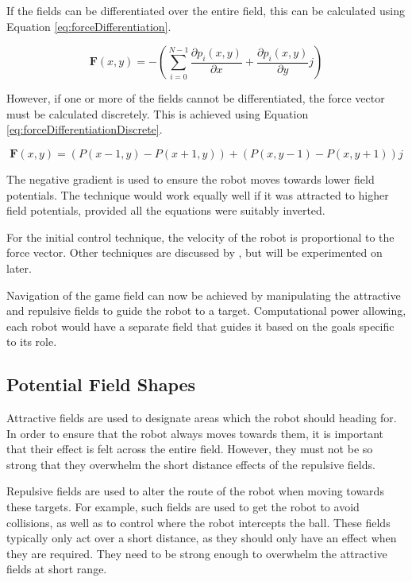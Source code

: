 \documentclass[10pt]{article}
\begin{document}
If the fields can be differentiated over the entire field, this can be
calculated using Equation \ref{eq:forceDifferentiation}.

\begin{equation}
\boldsymbol{F}(x,y)=-\left(\sum_{i=0}^{N-1}\frac{\partial p_{i}\left(x,y\right)}{\partial x}+\frac{\partial p_{i}\left(x,y\right)}{\partial y}j\right)
\label{eq:forceDifferentiation}
\end{equation}

However, if one or more of the fields cannot be differentiated, the force vector
must be calculated discretely. This is achieved using Equation
\ref{eq:forceDifferentiationDiscrete}.

\begin{equation}
\boldsymbol{F}(x,y)=\left(P\left(x-1,y\right)-P\left(x+1,y\right)\right)+\left(P\left(x,y-1\right)-P\left(x,y+1\right)\right)j
\label{eq:forceDifferentiationDiscrete}
\end{equation}

The negative gradient is used to ensure the robot moves towards lower field
potentials. The technique would work equally well if it was attracted to higher
field potentials, provided all the equations were suitably inverted.

For the initial control technique, the velocity of the robot is proportional to
the force vector. Other techniques are discussed by
\cite{intelligentAlgorithmPathPlanning}, but will be experimented on later.

Navigation of the game field can now be achieved by manipulating the attractive
and repulsive fields to guide the robot to a target. Computational power
allowing, each robot would have a separate field that guides it based on the
goals specific to its role.

\subsection{Potential Field Shapes}

Attractive fields are used to designate areas which the robot should heading
for. In order to ensure that the robot always moves towards them, it is
important that their effect is felt across the entire field. However, they must
not be so strong that they overwhelm the short distance effects of the repulsive
fields.

Repulsive fields are used to alter the route of the robot when moving towards
these targets. For example, such fields are used to get the robot to avoid
collisions, as well as to control where the robot intercepts the ball. These
fields typically only act over a short distance, as they should only have an
effect when they are required. They need to be strong enough to overwhelm the
attractive fields at short range.
\end{document}
